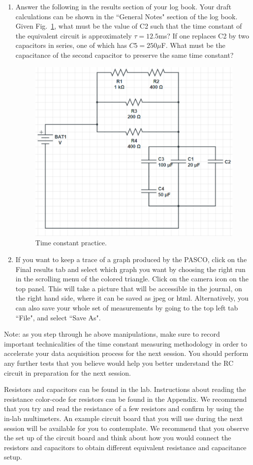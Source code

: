 \documentclass[12pt]{report}
\begin{document}
\begin{enumerate}
\item {\color{blue}Answer the following in the results section of your log book.} Your draft calculations can be shown in the ``General Notes" section of the log book. Given Fig.~\ref{Fig:lab2-session1-tau-practice}, what must be the value of C2 such that the time constant of the equivalent circuit is approximately $\tau=12.5$ms?
If one replaces C2 by two capacitors in series, one of which has $C5=250\mu$F. What must be the capacitance of the second capacitor to preserve the same time constant?
\begin{figure}[h]
\centering
\includegraphics[width=0.6\linewidth]{lab2-session1-Cpractice}
\caption{Time constant practice.}
\label{Fig:lab2-session1-tau-practice}
\end{figure}

\item If you want to keep a trace of a graph produced by the PASCO, click on the Final results tab and select which graph you want by choosing the right run in the scrolling menu of the colored triangle. 
Click on the camera icon on the top panel. This will take a picture that will be accessible in the journal, on the right hand side, where it can be saved as jpeg or html. 
Alternatively, you can also save your whole set of measurements by going to the top left tab ``File", and select ``Save As".
\end{enumerate}

Note: as you step through he above manipulations, make sure to record important technicalities of the time constant measuring methodology in order to accelerate your data acquisition process for the next session. 
You should perform any further tests that you believe would help you better understand the RC circuit in preparation for the next session.

Resistors and capacitors can be found in the lab. Instructions about reading the resistance color-code for resistors can be found in the Appendix.
We recommend that you try and read the resistance of a few resistors and confirm by using the in-lab multimeters. 
An example circuit board that you will use during the next session will be available for you to contemplate. 
We recommend that you observe the set up of the circuit board and think about how you would connect the resistors and capacitors to obtain different equivalent resistance and capacitance setup.
\end{document}
